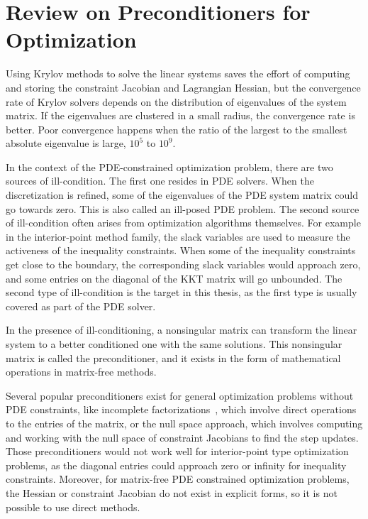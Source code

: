 \section{Review on Preconditioners for Optimization}\label{2:krylov:pc}
Using Krylov methods to solve the linear systems saves the effort of computing and storing the constraint Jacobian and Lagrangian Hessian, but the convergence rate of Krylov solvers depends on the distribution of eigenvalues of the system matrix. If the eigenvalues are clustered in a small radius, the convergence rate is better. Poor convergence happens when the ratio of the largest to the smallest absolute eigenvalue is large, \eg $10^5$ to $10^9$. 

In the context of the PDE-constrained optimization problem, there are two sources of ill-condition. The first one resides in PDE solvers. When the discretization is refined, some of the eigenvalues of the PDE system matrix could go towards zero. This is also called an ill-posed PDE problem. The second source of ill-condition often arises from optimization algorithms themselves. For example in the interior-point method family, the slack variables are used to measure the activeness of the inequality constraints. When some of the inequality constraints get close to the boundary, the corresponding slack variables would approach zero, and some entries on the diagonal of the KKT matrix will go unbounded. The second type of ill-condition is the target in this thesis, as the first type is usually covered as part of the PDE solver.     

In the presence of ill-conditioning, a nonsingular matrix can transform the linear system to a better conditioned one with the same solutions. This nonsingular matrix is called the preconditioner, and it exists in the form of mathematical operations in matrix-free methods. 

Several popular preconditioners exist for general optimization problems without PDE constraints, like incomplete factorizations~\cite{saad:2003}, which involve direct operations to the entries of the matrix,
or the null space approach, which involves computing and working with the null space of constraint Jacobians to find the step updates. Those preconditioners would not work well for interior-point type optimization problems, as the diagonal entries could approach zero or infinity for inequality constraints. Moreover, for matrix-free PDE constrained optimization problems, the Hessian or constraint Jacobian do not exist in explicit forms, so it is not possible to use direct methods.  

